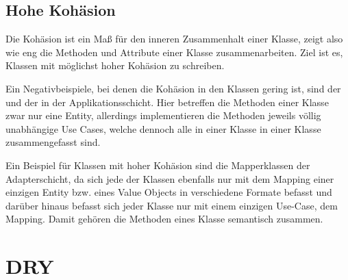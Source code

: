 \subsection{Hohe Kohäsion}
Die Kohäsion ist ein Maß für den inneren Zusammenhalt einer Klasse, zeigt also wie eng die Methoden und Attribute einer Klasse zusammenarbeiten. Ziel ist es, Klassen mit möglichst hoher Kohäsion zu schreiben.

Ein Negativbeispiele, bei denen die Kohäsion in den Klassen gering ist, sind der  und der  in der Applikationsschicht. Hier betreffen die Methoden einer Klasse zwar nur eine Entity, allerdings implementieren die Methoden jeweils völlig unabhängige Use Cases, welche dennoch alle in einer Klasse in einer Klasse zusammengefasst sind.

Ein Beispiel für Klassen mit hoher Kohäsion sind die Mapperklassen der Adapterschicht, da sich jede der Klassen ebenfalls nur mit dem Mapping einer einzigen Entity bzw. eines Value Objects in verschiedene Formate befasst und darüber hinaus befasst sich jeder Klasse nur mit einem einzigen Use-Case, dem Mapping. Damit gehören die Methoden eines Klasse semantisch zusammen.

\section{DRY}
